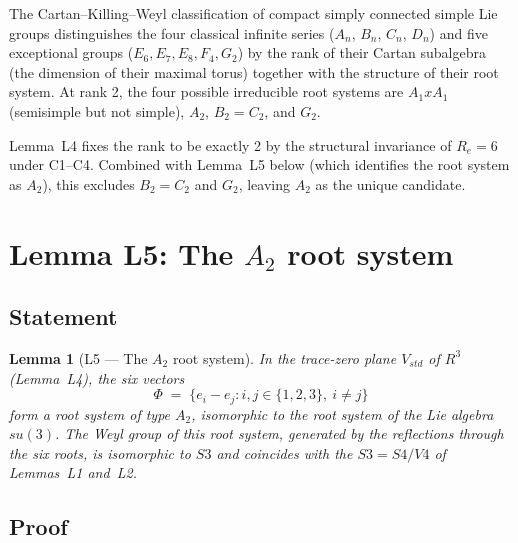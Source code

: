 \documentclass[11pt,a4paper]{article}
\def\Sfour{S4}%
\def\Vfour{V4}%
\def\Sthree{S3}%
\def\Re{Re}%
\def\times{x}%
\def\RR{R}%
\def\suthree{su(3)}%
\def\mathbb#1{#1}%
\def\mathrm#1{#1}%
\def\mathfrak#1{#1}%
\theoremstyle{plain}
\newtheorem{lemma}[theorem]{Lemma}
\theoremstyle{definition}
\theoremstyle{remark}
\newcommand{\Sfour}{S_4}
\newcommand{\Vfour}{V_4}
\newcommand{\Sthree}{S_3}
\renewcommand{\Re}{R_e}
\newcommand{\suthree}{\mathfrak{su}(3)}
\newcommand{\RR}{\mathbb{R}}
\begin{document}
The Cartan--Killing--Weyl classification of compact simply connected simple Lie groups distinguishes the four classical infinite series ($A_n$, $B_n$, $C_n$, $D_n$) and five exceptional groups ($E_6, E_7, E_8, F_4, G_2$) by the rank of their Cartan subalgebra (the dimension of their maximal torus) together with the structure of their root system. At rank 2, the four possible irreducible root systems are $A_1 \times A_1$ (semisimple but not simple), $A_2$, $B_2 = C_2$, and $G_2$.

Lemma~L4 fixes the rank to be exactly 2 by the structural invariance of $\Re = 6$ under C1--C4. Combined with Lemma~L5 below (which identifies the root system as $A_2$), this excludes $B_2 = C_2$ and $G_2$, leaving $A_2$ as the unique candidate.

\section{Lemma L5: The \texorpdfstring{$A_2$}{A2} root system}
\label{sec:L5}

\subsection{Statement}

\begin{lemma}[L5 --- The $A_2$ root system]
\label{lem:L5}
In the trace-zero plane $V_{\mathrm{std}}$ of $\RR^3$ (Lemma~L4), the six vectors
\begin{equation}
\Phi \;=\; \{e_i - e_j : i,j \in \{1,2,3\},\ i \neq j\}
\label{eq:A2_roots}
\end{equation}
form a root system of type $A_2$, isomorphic to the root system of the Lie algebra $\suthree$. The Weyl group of this root system, generated by the reflections through the six roots, is isomorphic to $\Sthree$ and coincides with the $\Sthree = \Sfour/\Vfour$ of Lemmas~L1 and~L2.
\end{lemma}

\subsection{Proof}
\end{document}
